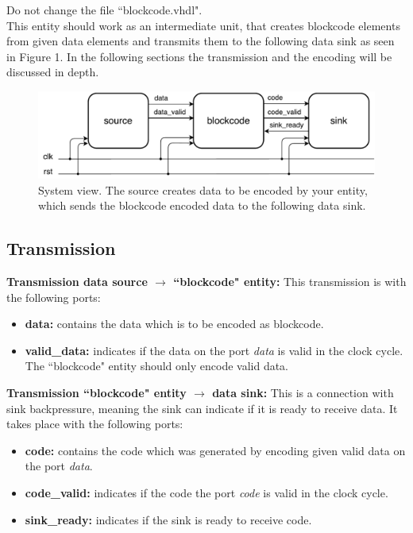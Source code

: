 \documentclass[a4paper,12pt]{article}
\begin{document}
Do not change the file ``blockcode.vhdl".\\

This entity should work as an intermediate unit, that creates blockcode elements from given data elements and transmits
them to the following data sink as seen in Figure 1. In the following sections the transmission and the encoding will
be discussed in depth.
\\

\begin{figure}[h!]
\centering
\includegraphics[scale=0.6]{../static/system_view.pdf} 
\caption{System view. The source creates data to be encoded by your entity, which sends the blockcode encoded data to
the following data sink.}
\end{figure}

\newpage
\subsection*{\noindent Transmission}

\textbf{Transmission data source $\rightarrow$ ``blockcode" entity:} This transmission is with the following ports:
\begin{itemize} 
\item \textbf{data:} contains the data which is to be encoded as blockcode.
\item \textbf{valid\_data:} indicates if the data on the port \textit{data} is valid in the clock cycle.
The ``blockcode" entity should only encode valid data.
\end{itemize}

\textbf{Transmission ``blockcode" entity $\rightarrow$ data sink:} This is a connection with sink backpressure, 
meaning the sink can indicate if it is ready to receive data. It takes place with the following ports:
\begin{itemize} 
\item \textbf{code:} contains the code which was generated by encoding given valid data on the port \textit{data}. 
\item \textbf{code\_valid:} indicates if the code the port \textit{code} is valid in the clock cycle.
\item \textbf{sink\_ready:} indicates if the sink is ready to receive code. 
\end{itemize}
\end{document}
